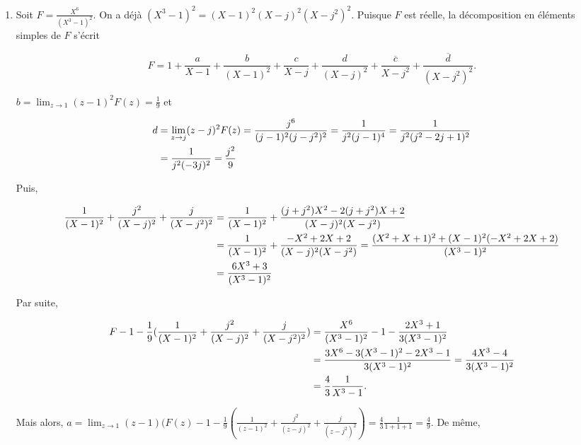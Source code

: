 {{\begin{enumerate}
Puis, $b=\lim_{x\rightarrow 2}(x-2)^2(F(x)-\frac{1}{64}(\frac{1}{(x-2)^3}-\frac{1}{(x+2)^3})=-\frac{3}{16}\frac{1}{(2+2)^2}
=-\frac{3}{256}$. Enfin, $x=0$ fournit $-\frac{1}{64}=-a-\frac{3}{512}-\frac{1}{256}$ et $a=\frac{1}{64}-\frac{5}{512}=\frac{3}{512}$. Donc,

$$F=\frac{1}{512}(\frac{3}{X-2}-\frac{6}{(X-2)^2}+\frac{8}{(X-2)^3}-\frac{3}{X+2}-\frac{6}{(X+2)^2}-\frac{8}{(X+2)^3}).$$

\item  Soit $F=\frac{X^6}{(X^3-1)^2}$. On a déjà $(X^3-1)^2=(X-1)^2(X-j)^2(X-j^2)^2$. Puisque $F$ est réelle, la décomposition en éléments simples de $F$ s'écrit

$$F=1+\frac{a}{X-1}+\frac{b}{(X-1)^2}+\frac{c}{X-j}+\frac{d}{(X-j)^2}+\frac{\overline{c}}{X-j^2}+\frac{\overline{d}}{(X-j^2)^2}.$$

$b=\lim_{z\rightarrow 1}(z-1)^2F(z)=\frac{1}{9}$ et 

\begin{align*}\ensuremath
d&=\lim_{z\rightarrow j}(z-j)^2F(z)=\frac{j^6}{(j-1)^2(j-j^2)^2}=\frac{1}{j^2(j-1)^4}=\frac{1}{j^2(j^2-2j+1)^2}\\
 &= \frac{1}{j^2(-3j)^2}=\frac{j^2}{9}
\end{align*}

Puis,

\begin{align*}\ensuremath
\frac{1}{(X-1)^2}+\frac{j^2}{(X-j)^2}+\frac{j}{(X-j^2)^2}&=\frac{1}{(X-1)^2}+\frac{(j+j^2)X^2-2(j+j^2)X+2}{(X-j)^2(X-j^2)}\\
 &=\frac{1}{(X-1)^2}+\frac{-X^2+2X+2}{(X-j)^2(X-j^2)}=\frac{(X^2+X+1)^2+(X-1)^2(-X^2+2X+2)}{(X^3-1)^2}\\
 &=\frac{6X^3+3}{(X^3-1)^2}
\end{align*}

Par suite,

\begin{align*}\ensuremath
F-1-\frac{1}{9}( \frac{1}{(X-1)^2}+\frac{j^2}{(X-j)^2}+\frac{j}{(X-j^2)^2})&=\frac{X^6}{(X^3-1)^2}-1-\frac{2X^3+1}{3(X^3-1)^2}\\
 &=\frac{3X^6-3(X^3-1)^2-2X^3-1}{3(X^3-1)^2}=\frac{4X^3-4}{3(X^3-1)^2}\\
 &=\frac{4}{3}\frac{1}{X^3-1}.
\end{align*}

Mais alors, $a=\lim_{z\rightarrow 1}(z-1)(F(z)-1-\frac{1}{9}(\frac{1}{(z-1)^2}+\frac{j^2}{(z-j)^2}+\frac{j}{(z-j^2)^2})
=\frac{4}{3}\frac{1}{1+1+1}=\frac{4}{9}$. De même,


\end{enumerate}}}
